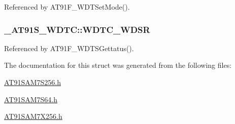 Referenced by AT91F\_\-WDTSetMode().\hypertarget{struct__AT91S__WDTC_2ecb6e3d2e39dbb08f6e797d337522c4}{
\subsubsection{ {\bf \_\-AT91S\_\-WDTC::WDTC\_\-WDSR}}}
\label{struct__AT91S__WDTC_2ecb6e3d2e39dbb08f6e797d337522c4}




Referenced by AT91F\_\-WDTSGettatus().

The documentation for this struct was generated from the following files:\begin{CompactItemize}
\item 
\hyperlink{AT91SAM7S256_8h}{AT91SAM7S256.h}\item 
\hyperlink{AT91SAM7S64_8h}{AT91SAM7S64.h}\item 
\hyperlink{AT91SAM7X256_8h}{AT91SAM7X256.h}\end{CompactItemize}
